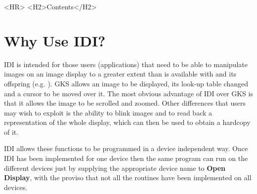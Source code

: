 %
\begin{htmlonly}
  \label{stardoccontents}
  \begin{rawhtml} 
     <HR>
     <H2>Contents</H2>
  \end{rawhtml}
\end{htmlonly}
\begin{latexonly}
   \setlength{\parskip}{0mm}
   \tableofcontents
   \setlength{\parskip}{\medskipamount}
   \markright{\stardocname}
\end{latexonly}

\newpage

\section{Why Use IDI?}

IDI is intended for those users (applications) that need to be able to
manipulate images on an image display to a greater extent than is
available with  and its offspring (e.g. 
). GKS allows an image to
be displayed, its look-up table changed and a cursor to be moved over it.
The most obvious advantage of IDI over GKS is that it allows the image
to be scrolled and zoomed. Other differences that users may wish to exploit
is the ability to blink images and to read back a representation of
the whole display, which can then be used to obtain a hardcopy of it.

IDI allows these functions to be programmed in a device independent way.
Once IDI has been implemented for one device then the same program can
run on the different devices just by supplying the appropriate device name
to {\bf Open Display}, with the proviso that not all the routines have
been implemented on all devices.

